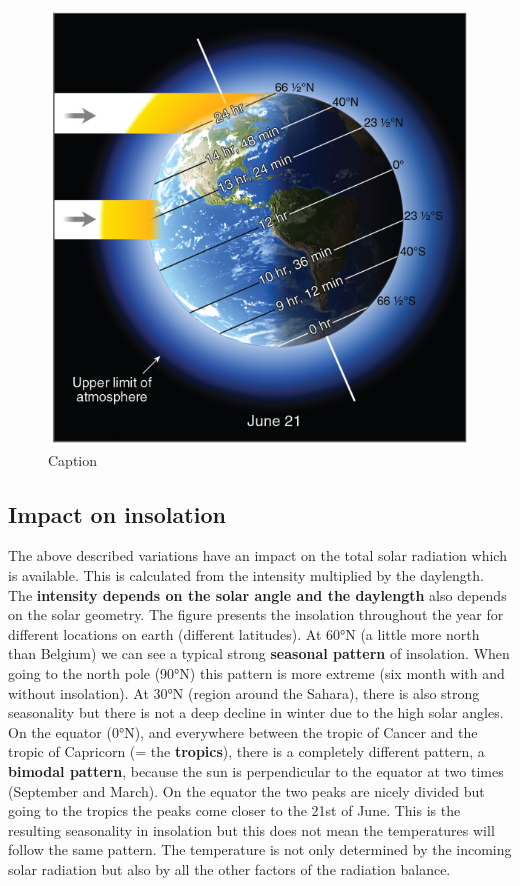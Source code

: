 \documentclass[12pt,oneside]{book}
\begin{document}
\begin{figure}

{\centering \includegraphics[width=0.5\linewidth]{figures/Figure26} 

}

\caption{Caption}\label{fig:Seasons6}
\end{figure}

\subsection{Impact on insolation}\label{impact-on-insolation}

The above described variations have an impact on the total solar
radiation which is available. This is calculated from the intensity
multiplied by the daylength. The \textbf{intensity depends on the solar
angle and the daylength} also depends on the solar geometry. The figure
presents the insolation throughout the year for different locations on
earth (different latitudes). At 60°N (a little more north than Belgium)
we can see a typical strong \textbf{seasonal pattern} of insolation.
When going to the north pole (90°N) this pattern is more extreme (six
month with and without insolation). At 30°N (region around the Sahara),
there is also strong seasonality but there is not a deep decline in
winter due to the high solar angles. On the equator (0°N), and
everywhere between the tropic of Cancer and the tropic of Capricorn (=
the \textbf{tropics}), there is a completely different pattern, a
\textbf{bimodal pattern}, because the sun is perpendicular to the
equator at two times (September and March). On the equator the two peaks
are nicely divided but going to the tropics the peaks come closer to the
21st of June. This is the resulting seasonality in insolation but this
does not mean the temperatures will follow the same pattern. The
temperature is not only determined by the incoming solar radiation but
also by all the other factors of the radiation balance.
\end{document}
